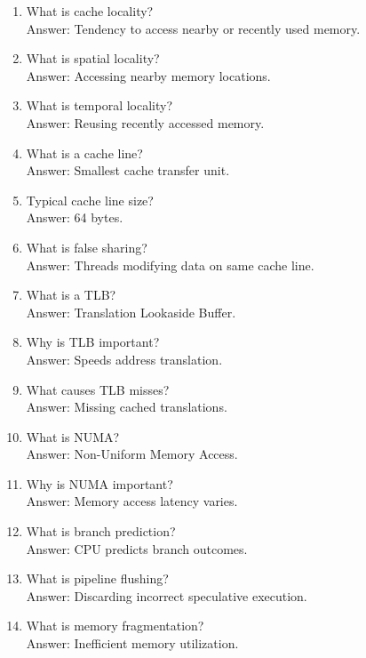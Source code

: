 \begin{enumerate}
\item What is cache locality?\\
Answer: Tendency to access nearby or recently used memory.

\item What is spatial locality?\\
Answer: Accessing nearby memory locations.

\item What is temporal locality?\\
Answer: Reusing recently accessed memory.

\item What is a cache line?\\
Answer: Smallest cache transfer unit.

\item Typical cache line size?\\
Answer: 64 bytes.

\item What is false sharing?\\
Answer: Threads modifying data on same cache line.

\item What is a TLB?\\
Answer: Translation Lookaside Buffer.

\item Why is TLB important?\\
Answer: Speeds address translation.

\item What causes TLB misses?\\
Answer: Missing cached translations.

\item What is NUMA?\\
Answer: Non-Uniform Memory Access.

\item Why is NUMA important?\\
Answer: Memory access latency varies.

\item What is branch prediction?\\
Answer: CPU predicts branch outcomes.

\item What is pipeline flushing?\\
Answer: Discarding incorrect speculative execution.

\item What is memory fragmentation?\\
Answer: Inefficient memory utilization.


\end{enumerate}
